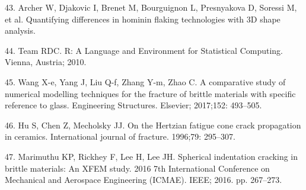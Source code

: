 \documentclass[10pt,letterpaper]{article}
\newenvironment{cslreferences}%
  {}%
  {\par}
\begin{document}
\begin{cslreferences}
\leavevmode\hypertarget{ref-archer_quantifying_nodate}{}%
43. Archer W, Djakovic I, Brenet M, Bourguignon L, Presnyakova D,
Soressi M, et al. Quantifying differences in hominin flaking
technologies with 3D shape analysis.

\leavevmode\hypertarget{ref-team_r_2010}{}%
44. Team RDC. R: A Language and Environment for Statistical Computing.
Vienna, Austria; 2010.

\leavevmode\hypertarget{ref-wang_comparative_2017}{}%
45. Wang X-e, Yang J, Liu Q-f, Zhang Y-m, Zhao C. A comparative study of
numerical modelling techniques for the fracture of brittle materials
with specific reference to glass. Engineering Structures. Elsevier;
2017;152: 493--505.

\leavevmode\hypertarget{ref-hu_hertzian_1996}{}%
46. Hu S, Chen Z, Mecholsky JJ. On the Hertzian fatigue cone crack
propagation in ceramics. International journal of fracture. 1996;79:
295--307.

\leavevmode\hypertarget{ref-marimuthu_spherical_2016}{}%
47. Marimuthu KP, Rickhey F, Lee H, Lee JH. Spherical indentation
cracking in brittle materials: An XFEM study. 2016 7th International
Conference on Mechanical and Aerospace Engineering (ICMAE). IEEE; 2016.
pp. 267--273.
\end{cslreferences}

\nolinenumbers
\end{document}
